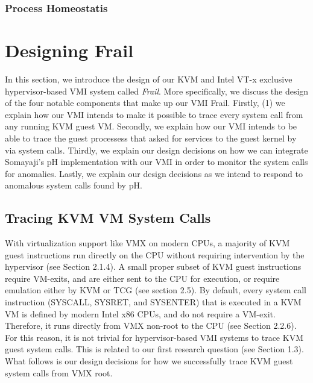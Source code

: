 \documentclass{report}
\begin{document}
\begin{spacing}{1.5}
\subsection{Process Homeostatis}



















\chapter{Designing Frail}

{\large
In this section, we introduce the design of our KVM and Intel VT-x exclusive hypervisor-based VMI system called \textit{Frail}. More specifically, we discuss the design of the four notable components that make up our VMI Frail. Firstly, (1) we explain how our VMI intends to make it possible to trace every system call from any running KVM guest VM. Secondly, we explain how our VMI intends to be able to trace the guest processess that asked for services to the guest kernel by via system calls. Thirdly, we explain our design decisions on how we can integrate Somayaji's pH implementation with our VMI in order to monitor the system calls for anomalies. Lastly, we explain our design decisions as we intend to respond to anomalous system calls found by pH. 
\newline
}

\section{Tracing KVM VM System Calls}
{\large
With virtualization support like VMX on modern CPUs, a majority of KVM guest instructions run directly on the CPU without requiring intervention by the hypervisor (see Section 2.1.4). A small proper subset of KVM guest instructions require VM-exits, and are either sent to the CPU for execution, or require emulation either by KVM or TCG (see section 2.5). By default, every system call instruction (SYSCALL, SYSRET, and SYSENTER) that is executed in a KVM VM is defined by modern Intel x86 CPUs, and do not require a VM-exit. Therefore, it runs directly from VMX non-root to the CPU (see Section 2.2.6). For this reason, it is not trivial for hypervisor-based VMI systems to trace KVM guest system calls. This is related to our first research question (see Section 1.3). What follows is our design decisions for how we successfully trace KVM guest system calls from VMX root.
\newline
}



\end{spacing}
\end{document}
